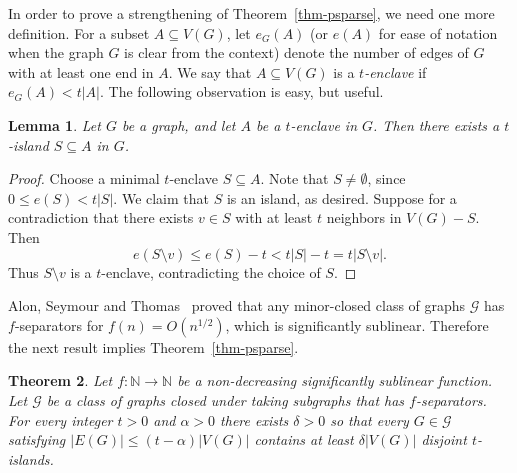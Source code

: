 \documentclass[12pt]{article}
\newtheorem{theorem}{Theorem}
\newtheorem{lemma}[theorem]{Lemma}
\newcommand{\mc}[1]{\mathcal{#1}}
\begin{document}
In order to prove a strengthening of Theorem~\ref{thm-psparse}, we need one more definition.
For a subset $A\subseteq V(G)$, let $e_G(A)$ (or $e(A)$ for ease of notation when the graph $G$ is clear from the context)
denote the number of edges of $G$ with at least one end in $A$. 
We say that $A\subseteq V(G)$ is a \emph{$t$-enclave} if $e_G(A) < t|A|$.
The following observation is easy, but useful.

\begin{lemma}\label{lemma-enclave}
	Let $G$ be a graph, and let $A$ be a $t$-enclave in $G$. Then there exists a $t$-island $S \subseteq A$ in $G$.
\end{lemma}

\begin{proof}
	Choose a minimal $t$-enclave $S \subseteq A$. Note that $S\neq\emptyset$, since $0\le e(S)<t|S|$.
	We claim that $S$ is an island, as desired. Suppose for a contradiction that there exists $v \in S$ with at least $t$ neighbors in $V(G)-S$. Then 
	$$e(S \setminus v) \leq e(S)-t < t|S|-t = t|S \setminus v|.$$ 
	Thus $S \setminus v$ is a $t$-enclave, contradicting the choice of $S$.
\end{proof}


Alon, Seymour and Thomas~\cite{alon1990separator} proved that any minor-closed class of graphs $\mc{G}$ has $f$-separators
for $f(n)=O(n^{1/2})$, which is significantly sublinear.
Therefore the next result implies Theorem~\ref{thm-psparse}.

\begin{theorem}\label{thm-percolgen2}
	Let $f:\mathbb{N}\to\mathbb{N}$ be a non-decreasing significantly sublinear function.
	Let $\mc{G}$ be a class of graphs closed under taking subgraphs that has $f$-separators.
	For every integer $t>0$ and $\alpha >0$ there exists $\delta>0$ so that every $G \in \mc{G}$ satisfying $|E(G)| \leq (t -\alpha)|V(G)|$ contains at least $\delta|V(G)|$ disjoint $t$-islands. 
\end{theorem}
\end{document}
